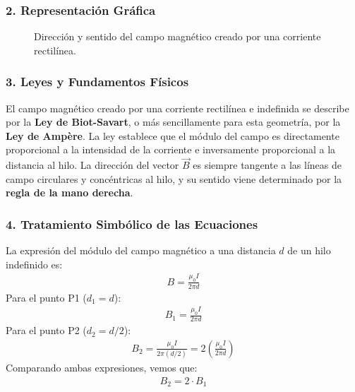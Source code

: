 \subsubsection*{2. Representación Gráfica}
\begin{figure}[H]
    \centering
    \caption{Dirección y sentido del campo magnético creado por una corriente rectilínea.}
\end{figure}

\subsubsection*{3. Leyes y Fundamentos Físicos}
El campo magnético creado por una corriente rectilínea e indefinida se describe por la \textbf{Ley de Biot-Savart}, o más sencillamente para esta geometría, por la \textbf{Ley de Ampère}. La ley establece que el módulo del campo es directamente proporcional a la intensidad de la corriente e inversamente proporcional a la distancia al hilo. La dirección del vector $\vec{B}$ es siempre tangente a las líneas de campo circulares y concéntricas al hilo, y su sentido viene determinado por la \textbf{regla de la mano derecha}.

\subsubsection*{4. Tratamiento Simbólico de las Ecuaciones}
La expresión del módulo del campo magnético a una distancia $d$ de un hilo indefinido es:
\begin{gather}
    B = \frac{\mu_0 I}{2 \pi d}
\end{gather}
Para el punto P1 ($d_1 = d$):
\begin{gather}
    B_1 = \frac{\mu_0 I}{2 \pi d}
\end{gather}
Para el punto P2 ($d_2 = d/2$):
\begin{gather}
    B_2 = \frac{\mu_0 I}{2 \pi (d/2)} = 2 \left( \frac{\mu_0 I}{2 \pi d} \right)
\end{gather}
Comparando ambas expresiones, vemos que:
\begin{gather}
    B_2 = 2 \cdot B_1
\end{gather}

